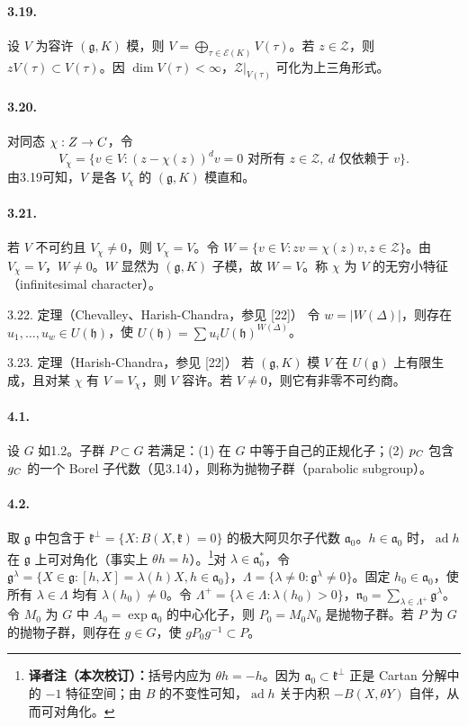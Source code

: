 \paragraph*{3.19.} 设 $V$ 为容许 $(\mathfrak g,K)$ 模，则 $V=\bigoplus_{\tau\in\mathcal E(K)}V(\tau)$。若 $z\in\mathcal Z$，则 $zV(\tau)\subset V(\tau)$。因 $\dim V(\tau)<\infty$，$\mathcal Z|_{V(\tau)}$ 可化为上三角形式。
\paragraph*{3.20.} 对同态 $\chi:Z\to C$，令
\[
 V_\chi=\{v\in V:(z-\chi(z))^dv=0\text{ 对所有 }z\in\mathcal Z,
 \ d\text{ 仅依赖于 }v\}.
\]
由3.19可知，$V$ 是各 $V_\chi$ 的 $(\mathfrak g,K)$ 模直和。
\paragraph*{3.21.} 若 $V$ 不可约且 $V_\chi\ne0$，则 $V_\chi=V$。令 $W=\{v\in V:zv=\chi(z)v,z\in\mathcal Z\}$。由 $V_\chi=V$，$W\ne0$。$W$ 显然为 $(\mathfrak g,K)$ 子模，故 $W=V$。称 $\chi$ 为 $V$ 的无穷小特征（infinitesimal character）。
\begin{originaltheorem}{3.22. 定理（Chevalley、Harish-Chandra，参见 [22]）}
令 $w=|W(\Delta)|$，则存在 $u_1,\ldots,u_w\in U(\mathfrak h)$，使 $U(\mathfrak h)=\sum u_iU(\mathfrak h)^{W(\Delta)}$。
\end{originaltheorem}
\begin{originaltheorem}{3.23. 定理（Harish-Chandra，参见 [22]）}
若 $(\mathfrak g,K)$ 模 $V$ 在 $U(\mathfrak g)$ 上有限生成，且对某 $\chi$ 有 $V=V_\chi$，则 $V$ 容许。若 $V\ne0$，则它有非零不可约商。
\end{originaltheorem}

\paragraph*{4.1.} 设 $G$ 如1.2。子群 $P\subset G$ 若满足：(1) 在 $G$ 中等于自己的正规化子；(2) $p_{C}$ 包含 $g_{C}$ 的一个 Borel 子代数（见3.14），则称为抛物子群（parabolic subgroup）。
\paragraph*{4.2.} 取 $\mathfrak g$ 中包含于 $\mathfrak k^\perp=\{X:B(X,\mathfrak k)=0\}$ 的极大阿贝尔子代数 $\mathfrak a_0$。$h\in\mathfrak a_0$ 时，$\operatorname{ad}h$ 在 $\mathfrak g$ 上可对角化（事实上 $\theta h=h$）。\footnote{\textbf{译者注（本次校订）：}括号内应为 $\theta h=-h$。因为 $\mathfrak a_0\subset\mathfrak k^\perp$ 正是 Cartan 分解中的 $-1$ 特征空间；由 $B$ 的不变性可知，$\operatorname{ad}h$ 关于内积 $-B(X,\theta Y)$ 自伴，从而可对角化。}对 $\lambda\in\mathfrak a_0^*$，令 $\mathfrak g^\lambda=\{X\in\mathfrak g:[h,X]=\lambda(h)X,h\in\mathfrak a_0\}$，$\Lambda=\{\lambda\ne0:\mathfrak g^\lambda\ne0\}$。固定 $h_0\in\mathfrak a_0$，使所有 $\lambda\in\Lambda$ 均有 $\lambda(h_0)\ne0$。令 $\Lambda^+=\{\lambda\in\Lambda:\lambda(h_0)>0\}$，$\mathfrak n_0=\sum_{\lambda\in\Lambda^+}\mathfrak g^\lambda$。令 $M_0$ 为 $G$ 中 $A_0=\exp\mathfrak a_0$ 的中心化子，则 $P_0=M_0N_0$ 是抛物子群。若 $P$ 为 $G$ 的抛物子群，则存在 $g\in G$，使 $gP_0g^{-1}\subset P$。
